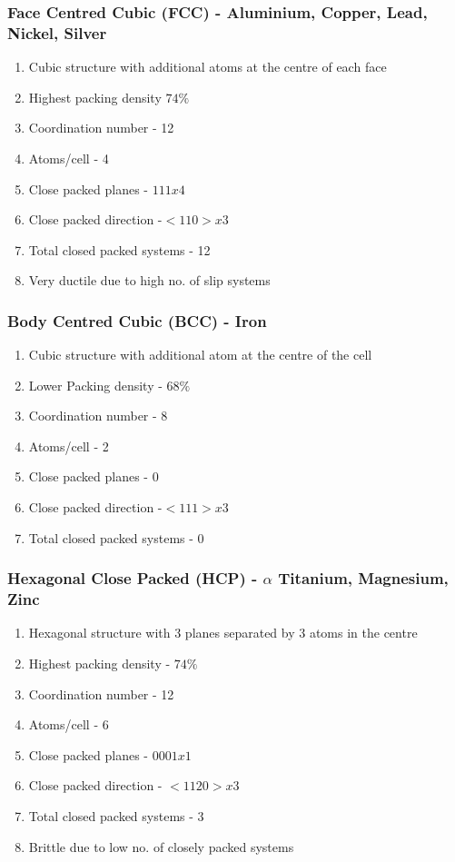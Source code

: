 
\subsubsection{Face Centred Cubic (FCC) - Aluminium, Copper, Lead, Nickel, Silver}
\begin{enumerate}
  \item Cubic structure with additional atoms at the centre of each face
  \item Highest packing density $74\%$
  \item Coordination number - 12
  \item Atoms/cell - 4
  \item Close packed planes - ${111} x 4$
  \item Close packed direction -$ <110> x 3$
  \item Total closed packed systems - 12
  \item Very ductile due to high no. of slip systems
\end{enumerate}

\subsubsection{Body Centred Cubic (BCC) - Iron}
\begin{enumerate}
  \item Cubic structure with additional atom at the centre of the cell
  \item Lower Packing density - $68\%$
  \item Coordination number - 8
  \item Atoms/cell - 2
  \item Close packed planes - 0
  \item Close packed direction -$ <111> x 3$
  \item Total closed packed systems - 0
\end{enumerate}

\subsubsection{Hexagonal Close Packed (HCP) - $\alpha$ Titanium, Magnesium, Zinc}
\begin{enumerate}
  \item Hexagonal structure with 3 planes separated by 3 atoms in the centre
  \item Highest packing density - $74\%$
  \item Coordination number - 12
  \item Atoms/cell - 6
  \item Close packed planes - ${0001} x 1$
  \item Close packed direction - $<1120> x 3$
  \item Total closed packed systems - 3
  \item Brittle due to low no. of closely packed systems
\end{enumerate}

